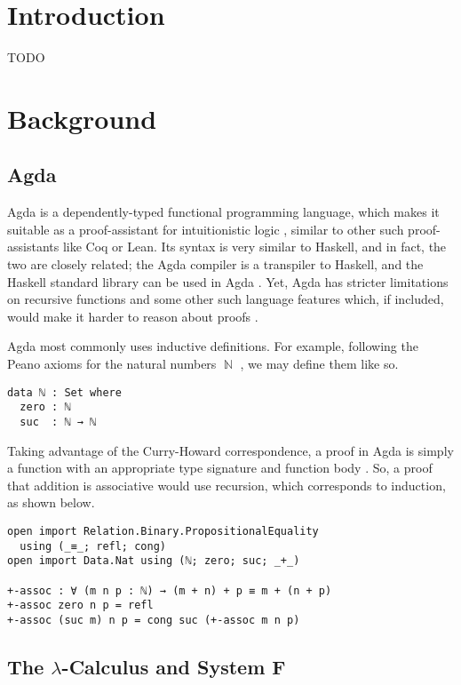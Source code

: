 \documentclass[logo,bsc,singlespacing,parskip,online]{infthesis}
\DeclareMathOperator{\nat}{\mathbb{N}}
\begin{document}
\chapter{Introduction}

TODO

\chapter{Background}

\section{Agda}
Agda is a dependently-typed functional programming language, which makes it
suitable as a proof-assistant for intuitionistic logic
\citep{norell_towards_2007}, similar to other such proof-assistants like Coq or
Lean. Its syntax is very similar to Haskell, and in fact, the two are closely
related; the Agda compiler is a transpiler to Haskell, and the Haskell standard
library can be used in Agda \citep{kusee_compiling_2017}. Yet, Agda has stricter
limitations on recursive functions and some other such language features which,
if included, would make it harder to reason about proofs
\citep{berghofer_brief_2009}.

Agda most commonly uses inductive definitions. For example, following the Peano
axioms for the natural numbers $\nat$ \citep{boolos_freges_1995}, we may define
them like so.

\begin{verbatim}
data ℕ : Set where
  zero : ℕ
  suc  : ℕ → ℕ
\end{verbatim}

Taking advantage of the Curry-Howard correspondence, a proof in Agda is simply a
function with an appropriate type signature and function body
\citep{wadler_propositions_2015}. So, a proof that addition is associative would
use recursion, which corresponds to induction, as shown below.

\begin{verbatim}
open import Relation.Binary.PropositionalEquality
  using (_≡_; refl; cong)
open import Data.Nat using (ℕ; zero; suc; _+_)

+-assoc : ∀ (m n p : ℕ) → (m + n) + p ≡ m + (n + p)
+-assoc zero n p = refl
+-assoc (suc m) n p = cong suc (+-assoc m n p)
\end{verbatim}

\section{The $\lambda$-Calculus and System F}
\end{document}
